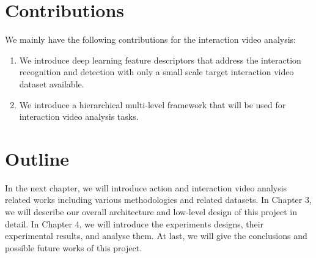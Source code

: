 \section{Contributions}
\label{sec:intro_sec03}

We mainly have the following contributions for the interaction video analysis: 
\begin{enumerate}
	\item We introduce deep learning feature descriptors that address the interaction recognition and detection with only a small scale target interaction video dataset available. 
	\item We introduce a hierarchical multi-level framework that will be used for interaction video analysis tasks.
\end{enumerate}

\section{Outline}
\label{sec:intro_outline}
In the next chapter, we will introduce action and interaction video analysis related works including various methodologies and related datasets. In Chapter 3, we will describe our overall architecture and low-level design of this project in detail. In Chapter 4, we will introduce the experiments designs, their experimental results, and analyse them. At last, we will give the conclusions and possible future works of this project.

